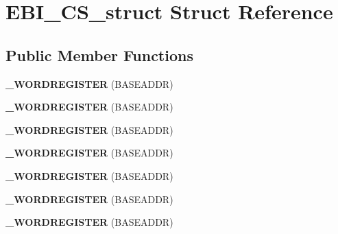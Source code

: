 \hypertarget{struct_e_b_i___c_s__struct}{}\section{E\+B\+I\+\_\+\+C\+S\+\_\+struct Struct Reference}
\label{struct_e_b_i___c_s__struct}
\subsection*{Public Member Functions}
\begin{DoxyCompactItemize}
\item 
{\bfseries \+\_\+\+W\+O\+R\+D\+R\+E\+G\+I\+S\+T\+ER} (B\+A\+S\+E\+A\+D\+DR)\hypertarget{struct_e_b_i___c_s__struct_a5af62353ce01068897b81bc9320830d7}{}\label{struct_e_b_i___c_s__struct_a5af62353ce01068897b81bc9320830d7}

\item 
{\bfseries \+\_\+\+W\+O\+R\+D\+R\+E\+G\+I\+S\+T\+ER} (B\+A\+S\+E\+A\+D\+DR)\hypertarget{struct_e_b_i___c_s__struct_a5af62353ce01068897b81bc9320830d7}{}\label{struct_e_b_i___c_s__struct_a5af62353ce01068897b81bc9320830d7}

\item 
{\bfseries \+\_\+\+W\+O\+R\+D\+R\+E\+G\+I\+S\+T\+ER} (B\+A\+S\+E\+A\+D\+DR)\hypertarget{struct_e_b_i___c_s__struct_a5af62353ce01068897b81bc9320830d7}{}\label{struct_e_b_i___c_s__struct_a5af62353ce01068897b81bc9320830d7}

\item 
{\bfseries \+\_\+\+W\+O\+R\+D\+R\+E\+G\+I\+S\+T\+ER} (B\+A\+S\+E\+A\+D\+DR)\hypertarget{struct_e_b_i___c_s__struct_a5af62353ce01068897b81bc9320830d7}{}\label{struct_e_b_i___c_s__struct_a5af62353ce01068897b81bc9320830d7}

\item 
{\bfseries \+\_\+\+W\+O\+R\+D\+R\+E\+G\+I\+S\+T\+ER} (B\+A\+S\+E\+A\+D\+DR)\hypertarget{struct_e_b_i___c_s__struct_a5af62353ce01068897b81bc9320830d7}{}\label{struct_e_b_i___c_s__struct_a5af62353ce01068897b81bc9320830d7}

\item 
{\bfseries \+\_\+\+W\+O\+R\+D\+R\+E\+G\+I\+S\+T\+ER} (B\+A\+S\+E\+A\+D\+DR)\hypertarget{struct_e_b_i___c_s__struct_a5af62353ce01068897b81bc9320830d7}{}\label{struct_e_b_i___c_s__struct_a5af62353ce01068897b81bc9320830d7}

\item 
{\bfseries \+\_\+\+W\+O\+R\+D\+R\+E\+G\+I\+S\+T\+ER} (B\+A\+S\+E\+A\+D\+DR)\hypertarget{struct_e_b_i___c_s__struct_a5af62353ce01068897b81bc9320830d7}{}\label{struct_e_b_i___c_s__struct_a5af62353ce01068897b81bc9320830d7}


\end{DoxyCompactItemize}
